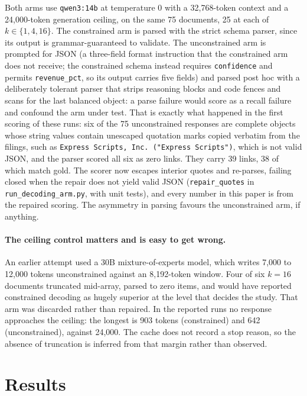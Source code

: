 \documentclass[11pt]{article}
\newcommand{\code}[1]{\texttt{\small #1}}
\begin{document}
Both arms use \code{qwen3:14b} at temperature 0 with a 32{,}768-token context and
a 24{,}000-token generation ceiling, on the same 75 documents, 25 at each of
$k \in \{1, 4, 16\}$. The constrained arm is parsed with the strict schema parser,
since its output is grammar-guaranteed to validate. The unconstrained arm is
prompted for JSON (a three-field format instruction that the constrained arm
does not receive; the constrained schema instead requires \code{confidence} and
permits \code{revenue\_pct}, so its output carries five fields) and parsed post hoc with a deliberately tolerant parser that
strips reasoning blocks and code fences and scans for the last balanced object:
a parse failure would score as a recall failure and confound the arm under test.
That is exactly what happened in the first scoring of these runs: six of the 75
unconstrained responses are complete objects whose string values contain
unescaped quotation marks copied verbatim from the filings, such as
\code{Express Scripts, Inc. ("Express Scripts")}, which is not valid JSON, and the
parser scored all six as zero links. They carry 39 links, 38 of which match gold.
The scorer now escapes interior quotes and re-parses, failing closed when the
repair does not yield valid JSON (\code{repair\_quotes} in
\code{run\_decoding\_arm.py}, with unit tests), and every number in this paper is
from the repaired scoring. The asymmetry in parsing favours the unconstrained arm,
if anything.

\paragraph{The ceiling control matters and is easy to get wrong.} An earlier
attempt used a 30B mixture-of-experts model, which writes 7{,}000 to 12{,}000
tokens unconstrained against an 8{,}192-token window. Four of six $k = 16$
documents truncated mid-array, parsed to zero items, and would have reported
constrained decoding as hugely superior at the level that decides the study. That arm was discarded rather than repaired. In the reported runs no
response approaches the ceiling: the longest is 903 tokens (constrained) and 642
(unconstrained), against 24{,}000. The cache does not record a stop reason, so
the absence of truncation is inferred from that margin rather than observed.

\section{Results}
\label{sec:results}
\end{document}
